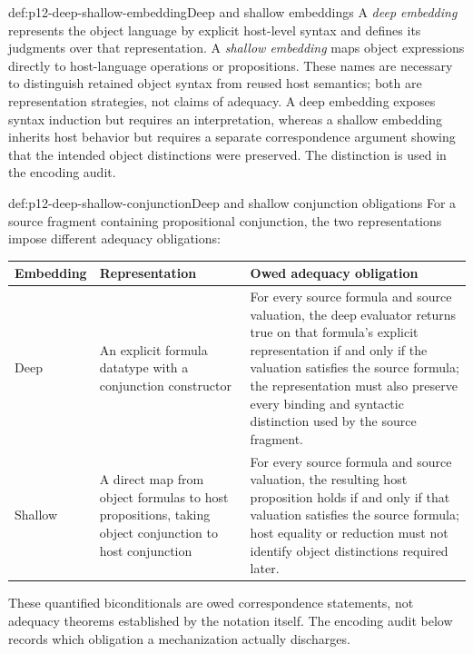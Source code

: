 \begin{hbdefinition}{def:p12-deep-shallow-embedding}{Deep and shallow embeddings}
A \emph{deep embedding} represents the object language by explicit host-level
syntax and defines its judgments over that representation.  A
\emph{shallow embedding} maps object expressions directly to host-language
operations or propositions.  These names are necessary to distinguish retained
object syntax from reused host semantics; both are representation strategies,
not claims of adequacy.  A deep embedding exposes syntax induction but requires
an interpretation, whereas a shallow embedding inherits host behavior but
requires a separate correspondence argument showing that the intended object
distinctions were preserved.  The distinction is used in the encoding audit.
\end{hbdefinition}

\begin{hbexample}{def:p12-deep-shallow-conjunction}{Deep and shallow conjunction obligations}
For a source fragment containing propositional conjunction, the two
representations impose different adequacy obligations:
\begin{center}
\small
\begin{tabular}{@{}p{}p{}p{}@{}}
\toprule
Embedding & Representation & Owed adequacy obligation \\ \midrule
Deep & An explicit formula datatype with a conjunction constructor & For
every source formula and source valuation, the deep evaluator returns true on
that formula's explicit representation if and only if the valuation satisfies
the source formula; the representation must also preserve every binding and
syntactic distinction used by the source fragment. \\
Shallow & A direct map from object formulas to host propositions, taking
object conjunction to host conjunction & For every source formula and source
valuation, the resulting host proposition holds if and only if that valuation
satisfies the source formula; host equality or reduction must not identify
object distinctions required later. \\
\bottomrule
\end{tabular}
\end{center}
These quantified biconditionals are owed correspondence statements, not
adequacy theorems established by the notation itself.  The encoding audit
below records which obligation a mechanization actually discharges.
\end{hbexample}

